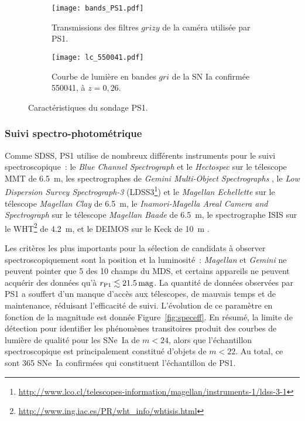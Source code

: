 \documentclass[../main/main.tex]{subfiles}
\begin{document}
\begin{figure}[ht]
    \centering
    \begin{subfigure}[]{.49\linewidth}
        \centering
        \texttt{[image: bands\_PS1.pdf]}
        \captionsetup{justification=centering}
        \caption{Transmissions des filtres $grizy$ de la caméra utilisée par
        PS1.}
        \label{fig:ps1bands}
    \end{subfigure}
    \begin{subfigure}[]{.49\linewidth}
        \centering
        \texttt{[image: lc\_550041.pdf]}
        \captionsetup{justification=centering}
        \caption{Courbe de lumière en bandes $gri$ de la SN Ia confirmée 550041,
        à $z = 0,26$.}
        \label{fig:lc_550041}
    \end{subfigure}
    \caption{Caractéristiques du sondage PS1.}
\end{figure}

\subsubsection{Suivi spectro-photométrique}\label{sssec:ps1spectro}

Comme SDSS, PS1 utilise de nombreux différents instruments pour le suivi
spectroscopique~: le \textit{Blue Channel Spectrograph} \citep{schmidt1989} et
le \textit{Hectospec} \citep{fabricant2005} sur le télescope MMT de \SI{6,5}{m},
les spectrographes de \textit{Gemini Multi-Object Spectrographs}
\citep[GMOS,][]{hook2004}, le \textit{Low Dispersion Survey Spectrograph-3}
(LDSS3\footnote{\href{http://www.lco.cl/telescopes-information/magellan/instruments-1/ldss-3-1}
{http://www.lco.cl/telescopes-information/magellan/instruments-1/ldss-3-1}}) et
le \textit{Magellan Echellette} \citep[MagE,][]{marshall2008} sur le télescope
\textit{Magellan Clay} de \SI{6,5}{m}, le \textit{Inamori-Magella Areal Camera
and Spectrograph} \citep[IMACS,][]{dressler2011} sur le télescope
\textit{Magellan Baade} de \SI{6,5}{m}, le spectrographe ISIS sur le
WHT\footnote{\href{http://www.ing.iac.es/PR/wht_info/whtisis.html}
{http://www.ing.iac.es/PR/wht\_info/whtisis.html}} de \SI{4,2}{m}, et le DEIMOS
\citep{faber2003} sur le Keck de \SI{10}{m} \citep{oke1995}.

Les critères les plus importants pour la sélection de candidats à observer
spectroscopiquement sont la position et la luminosité~: \textit{Magellan} et
\textit{Gemini} ne peuvent pointer que 5 des 10 champs du MDS, et certains
appareils ne peuvent acquérir des données qu'à $r_{\rm P1} \lesssim
\SI{21,5}{mag}$. La quantité de données observées par PS1 a souffert d'un manque
d'accès aux télescopes, de mauvais temps et de maintenance, réduisant
l'efficacité de suivi. L'évolution de ce paramètre en fonction de la magnitude
est donnée Figure~\ref{fig:speceff}. En résumé, la limite de détection pour
identifier les phénomènes transitoires produit des courbes de lumière de qualité
pour les SNe~Ia de $m < 24$, alors que l'échantillon spectroscopique est
principalement constitué d'objets de $m < 22$. Au total, ce sont 365 SNe~Ia
confirmées qui constituent l'échantillon de PS1.
\end{document}
